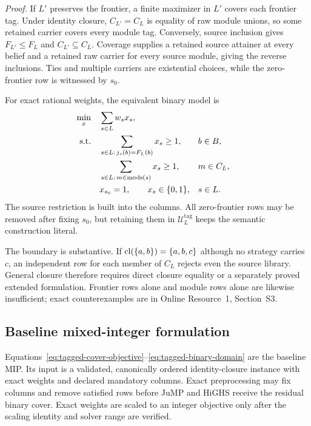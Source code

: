 \noindent\emph{Proof.}
If \(L'\) preserves the frontier, a finite maximizer in \(L'\) covers each
frontier tag.  Under identity closure,
\(C_{L'}=C_L\) is equality of raw module unions, so some retained carrier
covers every module tag.  Conversely, source inclusion gives
\(F_{L'}\leq F_L\) and \(C_{L'}\subseteq C_L\).  Coverage supplies a retained
source attainer at every belief and a retained raw carrier for every source
module, giving the reverse inclusions.  Ties and multiple carriers are
existential choices, while the zero-frontier row is witnessed by \(s_0\).

For exact rational weights, the equivalent binary model is
\begin{align}
 \min_x\quad &\sum_{s\in L}w_sx_s,
     \label{eq:tagged-cover-objective}\\
 \text{s.t.}\quad
 &\sum_{s\in L:\,j_s(b)=F_L(b)}x_s\geq1,
       &&b\in B,
       \label{eq:tagged-frontier-rows}\\
 &\sum_{s\in L:\,m\in\operatorname{mods}(s)}x_s\geq1,
       &&m\in C_L,
       \label{eq:tagged-module-rows}\\
 &x_{s_0}=1,\qquad x_s\in\{0,1\},
       &&s\in L.
       \label{eq:tagged-binary-domain}
\end{align}
The source restriction is built into the columns.  All zero-frontier rows may
be removed after fixing \(s_0\), but retaining them in
\(\mathcal U_L^{\mathrm{tag}}\) keeps the semantic construction literal.

The boundary is substantive.  If
\(\operatorname{cl}(\{a,b\})=\{a,b,c\}\) although no strategy carries \(c\), an independent
row for each member of \(C_L\) rejects even the source library.  General
closure therefore requires direct closure equality or a separately proved
extended formulation.  Frontier rows alone and module rows alone are likewise
insufficient; exact counterexamples are in Online Resource~1, Section~S3.

\subsection{Baseline mixed-integer formulation}
\label{subsec:aor-baseline-mip}

Equations~\eqref{eq:tagged-cover-objective}--\eqref{eq:tagged-binary-domain}
are the baseline MIP.  Its input is a validated, canonically ordered
identity-closure instance with exact weights and declared mandatory columns.
Exact preprocessing may fix columns and remove satisfied rows before JuMP and
HiGHS receive the residual binary cover.  Exact weights are scaled to an
integer objective only after the scaling identity and solver range are
verified.

